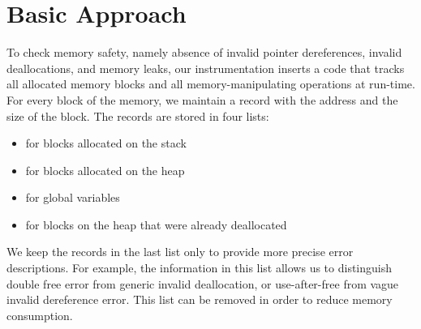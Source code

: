 \section{Basic Approach}

To check memory safety, namely absence of invalid pointer dereferences, invalid
deallocations, and memory leaks, our instrumentation inserts a code that tracks
all allocated memory blocks and all memory-manipulating operations at run-time.
For every block of the memory, we maintain a record with the address and the size
of the block. The records are stored in four lists:
\begin{itemize}
  \item \stacklist for blocks allocated on the stack
  \item \heaplist for blocks allocated on the heap
  \item \globalslist for global variables
  \item \dealloclist for blocks on the heap that were already deallocated
\end{itemize}
We keep the records in the last list only to provide more precise
error descriptions. For example, the information in this list allows
us to distinguish double free error from generic invalid deallocation,
or use-after-free from vague invalid dereference error. This list can
be removed in order to reduce memory consumption.

